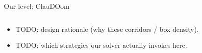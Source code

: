\begin{frame}{Our level: ClauDOom}
  \begin{columns}[T, onlytextwidth]
  \end{columns}

  \vspace{0.2cm}
  \begin{itemize}
    \item TODO: design rationale (why these corridors / box density).
    \item TODO: which strategies our solver actually invokes here.
  \end{itemize}
\end{frame}
